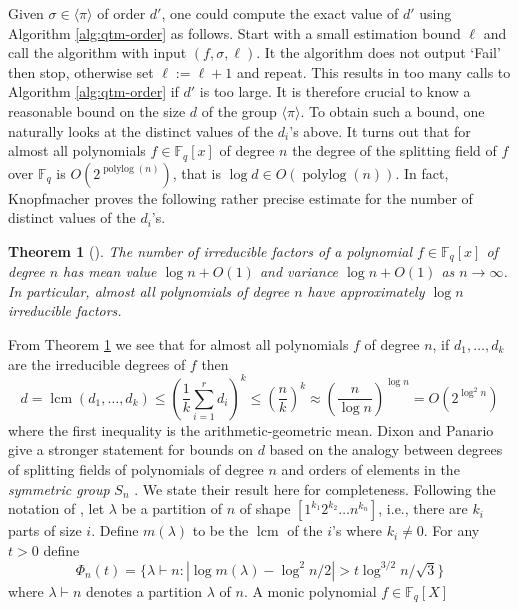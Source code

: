 \documentclass{article}
\theoremstyle{plain}
\newtheorem{theorem}{Theorem}
\theoremstyle{definition}
\newcommand{\lrang}[1]{\langle#1\rangle}
\newcommand{\abs}[1]{\left\vert#1\right\vert}
\DeclareMathOperator{\lcm}{lcm} %
\DeclareMathOperator{\polylog}{polylog}
\def\F{\ensuremath{\mathbb{F}}}
\begin{document}
Given $\sigma \in \lrang{\pi}$ of order $d'$, one could compute the exact value of $d'$ using 
Algorithm \ref{alg:qtm-order} as follows. Start with a small estimation bound $\ell$ and call the 
algorithm with input $(f, \sigma, \ell)$. It the algorithm does not output `Fail' then stop, 
otherwise set $\ell := \ell + 1$ and repeat. This results in too many calls to Algorithm 
\ref{alg:qtm-order} if $d'$ is too large. It is therefore crucial to know a reasonable bound on the 
size $d$ of the group $\lrang{\pi}$. To obtain such a bound, one naturally looks at the distinct 
values of the $d_i$'s above. It turns out that for almost all polynomials $f \in \F_q[x]$ of degree 
$n$ the degree of the splitting field of $f$ over $\F_q$ is $O(2^{\polylog(n)})$, that is $\log d 
\in O(\polylog(n))$. In fact, Knopfmacher proves the following rather precise estimate for the 
number of distinct values of the $d_i$'s.
\begin{theorem}[\cite{knopfmacher1999degrees}]
	\label{thm:d-mean}
	The number of irreducible factors of a polynomial $f \in \F_q[x]$ of degree $n$ has mean value 
	$\log n + O(1)$ and variance $\log n + O(1)$ as $n \rightarrow \infty$. In particular, almost 
	all polynomials of degree $n$ have approximately $\log n$ irreducible factors.
\end{theorem}
From Theorem \ref{thm:d-mean} we see that for almost all polynomials $f$ of degree $n$, if $d_1, 
\dots, d_k$ are the irreducible degrees of $f$ then 
\begin{equation}
	\label{equ:ag-mean}
	d = \lcm(d_1, \dots, d_k) \le \left( \frac{1}{k} \sum_{i = 1}^rd_i \right)^k \le \left( 
	\frac{n}{k} \right)^k \approx \left( \frac{n}{\log n} \right)^{\log n} = O(2^{\log^2n})
\end{equation}
where the first inequality is the arithmetic-geometric mean. Dixon and Panario 
\cite{dixon2004degree} give a stronger statement for bounds on $d$ based on the analogy between 
degrees of splitting fields of polynomials of degree $n$ and orders of elements in the 
\textit{symmetric group} $S_n$ \cite{erdos1965some, erdos1967some}. We state their result here 
for completeness. Following the notation of \cite{dixon2004degree}, let $\lambda$ be a partition of 
$n$ of shape $[1^{k_1} 2^{k_2} \dots n^{k_n}]$, i.e., there are $k_i$ parts of size $i$. Define 
$m(\lambda)$ to be the $\lcm$ of the $i$'s where $k_i \ne 0$. For any $t > 0$ define 
\[ \Phi_n(t) = \{ \lambda \vdash n : \abs{\log m(\lambda) - \log^2n / 2} > t\log^{3/2}n / \sqrt{3} 
\} \]
where $\lambda \vdash n$ denotes a partition $\lambda$ of $n$. A monic polynomial $f \in \F_q[X]$ 
\end{document}
